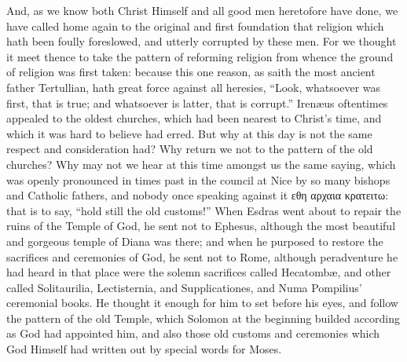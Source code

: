 And, as we know both Christ Himself and all good men heretofore have
done, we have called home again to the original and first foundation
that religion which hath been foully foreslowed, and utterly corrupted
by these men. For we thought it meet thence to take the pattern
of reforming religion from whence the ground of religion was first taken:
because this one reason, as saith the most ancient father Tertullian,
hath great force against all heresies, “Look, whatsoever was first,
that is true; and whatsoever is latter, that is corrupt.”
Irenæus oftentimes appealed to the oldest churches,
which had been nearest to Christ’s time, and which it was hard
to believe had erred. But why at this day is not the same respect
and consideration had? Why return we not to the pattern of the
old churches? Why may not we hear at this time amongst us the
same saying, which was openly pronounced in times past in the council
at Nice by so many bishops and Catholic fathers, and nobody once speaking
against it εθη αρχαια
κρατειτω: that is to say,
“hold still the old customs!” When Esdras went about
to repair the ruins of the Temple of God, he sent not to Ephesus, although
the most beautiful and gorgeous temple of Diana was there; and when
he purposed to restore the sacrifices and ceremonies of God, he sent
not to Rome, although peradventure he had heard in that place were the
solemn sacrifices called Hecatombæ, and other called Solitaurilia,
Lectisternia, and Supplicationes, and Numa Pompilius’ ceremonial
books. He thought it enough for him to set before his eyes, and
follow the pattern of the old Temple, which Solomon at the beginning
builded according as God had appointed him, and also those old customs
and ceremonies which God Himself had written out by special words for
Moses.

